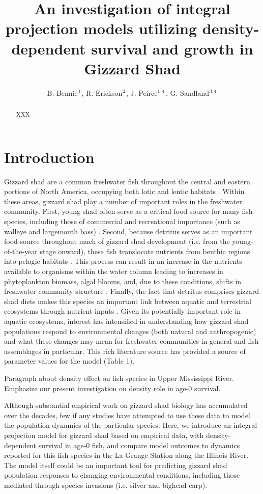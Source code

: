\documentclass[11pt,oneside]{amsart}
\title[Gizzard Shad Model]{An investigation of integral projection models utilizing density-dependent survival and growth in Gizzard Shad}
\author{B. Bennie$^{\rm 1}$, R. Erickson$^{\rm 2}$, J. Peirce$^{\rm 1,4}$,  G.  Sandland$^{\rm 3,4}$}
\theoremstyle{definition}
\begin{document}
\maketitle

\begin{abstract}
XXX
\end{abstract}

\section{Introduction}
Gizzard shad are a common freshwater fish throughout the central and eastern portions of North America, occupying both lotic and lentic habitats \citep{pierce1981aspects,vanni2005linking}. Within these areas, gizzard shad play a number of important roles in the freshwater community. First, young shad often serve as a critical food source for many fish species, including those of commercial and recreational importance (such as walleye and largemouth bass) \citep{jester1972life}. Second, because detritus serves as an important food source throughout much of gizzard shad development (i.e. from the young-of-the-year stage onward), these fish translocate nutrients from benthic regions into pelagic habitats \citep{mather1995regeneration, schaus2000effects, vanni2005linking}. This process can result in an increase in the nutrients available to organisms within the water column leading to increases in phytoplankton biomass, algal blooms, and, due to these conditions, shifts in freshwater community structure \citep{aday2003direct, schaus2000effects}. Finally, the fact that detritus comprises gizzard shad diets makes this species an important link between aquatic and terrestrial ecosystems through nutrient inputs \citep{schaus2000effects}. Given its potentially important role in aquatic ecosystems, interest has intensified in understanding how gizzard shad populations respond to environmental changes (both natural and anthropogenic) and what these changes may mean for freshwater communities in general and fish assemblages in particular. This rich literature source has provided a source of parameter values for the model (Table 1).

Paragraph about density effect on fish species in Upper Mississippi River. Emphasize our present investigation on density role in age-0 survival.

Although substantial empirical work on gizzard shad biology has accumulated over the decades, few if any studies have attempted to use these data to model the population dynamics of the particular species. Here, we introduce an integral projection model for gizzard shad based on empirical data, with density-dependent survival in age-0 fish, and compare model outcomes to dynamics reported for this fish species in the La Grange Station along the Illinois River. The model itself could be an important tool for predicting gizzard shad population responses to changing environmental conditions, including those mediated through species invasions (i.e. silver and bighead carp).
\end{document}
